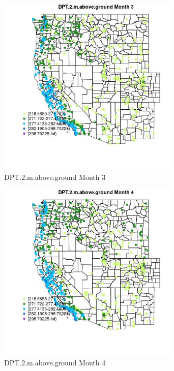 \begin{figure} 
\centering  
\includegraphics[width=0.77\textwidth]{Code_Outputs/Report_ML_input_PM25_Step4_part_e_de_duplicated_aves_compiled_2019-05-21wNAs_MapObsMo3DPT2maboveground.jpg} 
\caption{\label{fig:Report_ML_input_PM25_Step4_part_e_de_duplicated_aves_compiled_2019-05-21wNAsMapObsMo3DPT2maboveground}DPT.2.m.above.ground Month 3} 
\end{figure} 
 

\begin{figure} 
\centering  
\includegraphics[width=0.77\textwidth]{Code_Outputs/Report_ML_input_PM25_Step4_part_e_de_duplicated_aves_compiled_2019-05-21wNAs_MapObsMo4DPT2maboveground.jpg} 
\caption{\label{fig:Report_ML_input_PM25_Step4_part_e_de_duplicated_aves_compiled_2019-05-21wNAsMapObsMo4DPT2maboveground}DPT.2.m.above.ground Month 4} 
\end{figure} 
 

